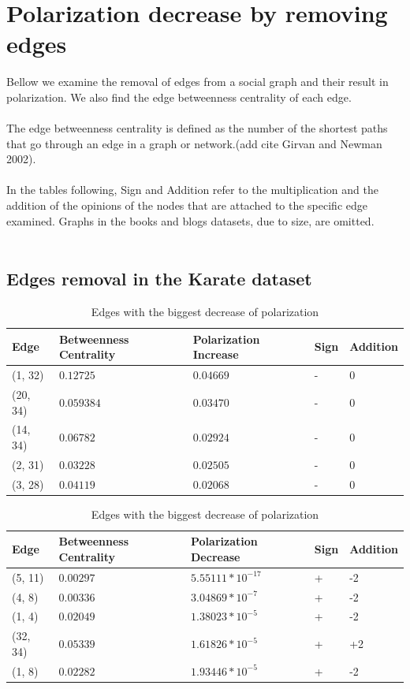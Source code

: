 \section{Polarization decrease by removing edges}
\label{sec:polremovingdecrease}
Bellow we examine the removal of edges from a social graph and their result in polarization. We also find the edge betweenness centrality of each edge. 
\\
\\
The edge betweenness centrality is defined as the number of the shortest paths that go through an edge in a graph or network.(add cite Girvan and Newman 2002). 
\\
\\
In the tables following, Sign and Addition refer to the multiplication and the addition of the opinions of the nodes that are attached to the specific edge examined. Graphs in the books and blogs datasets, due to size, are omitted.
\\
\\

\subsection{Edges removal in the Karate dataset}

\begin{table}[H]
 \centering
 \caption{Edges with the biggest increase of polarization}
 \label{tab:edgesLargest}
 \begin{tabular}{| l || l | l | l | l |}
 \hline
  Edge & Betweenness Centrality & Polarization Increase & Sign & Addition\\
  \hline
  \hline
  (1, 32) & $0.12725$ & $0.04669$ & - &  0\\
  \hline
  (20, 34) & $0.059384$ & $0.03470$ & - &  0\\
  \hline
  (14, 34) & $0.06782$ & $0.02924$ & - &  0\\
  \hline
  (2, 31) & $0.03228$ & $0.02505$ & - &  0\\
  \hline
  (3, 28) & $0.04119$ & $0.02068$ & - &  0\\
  \hline
 \end{tabular}
  
 \caption{Edges with the biggest decrease of polarization }
 \label{tab:edgesLargest}
 \begin{tabular}{| l || l | l | l | l |}
 \hline
  Edge & Betweenness Centrality & Polarization Decrease & Sign & Addition\\
  \hline
  \hline
  (5, 11) & $0.00297$ & $5.55111*10^{-17}$ & + &  -2\\
  \hline
  (4, 8) & $0.00336$ & $3.04869*10^{-7}$ & + &  -2\\
  \hline
  (1, 4) & $0.02049$ & $1.38023*10^{-5}$ & + &  -2\\
  \hline
  (32, 34) & $0.05339$ & $1.61826*10^{-5}$ & + &  +2\\
  \hline
  (1, 8) & $0.02282$ & $1.93446*10^{-5}$ & + &  -2\\
  \hline
  \hline
 \end{tabular}
\end{table}

